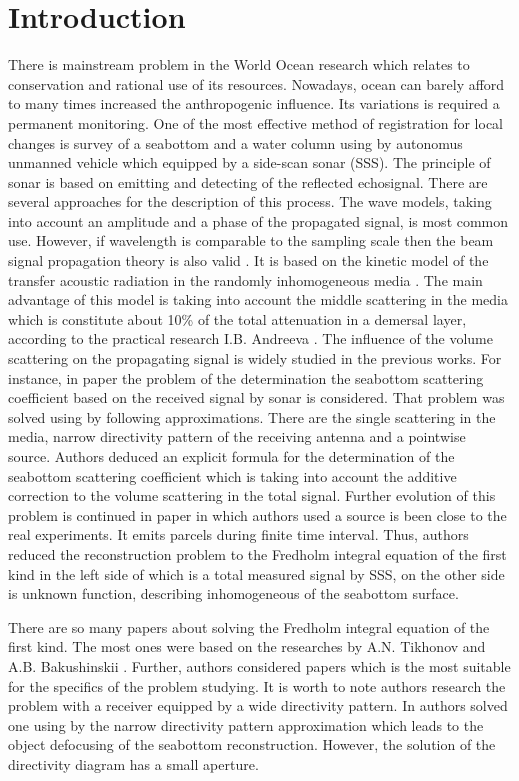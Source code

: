 \documentclass{procDDs}
\begin{document}
\section{Introduction}
There is mainstream problem in the World Ocean research which relates to conservation and rational use of its resources. Nowadays, ocean can barely afford to many times increased the anthropogenic influence. Its variations is required a permanent monitoring. One of the most effective method of registration for local changes is survey of a seabottom and a water column using by autonomus unmanned vehicle which equipped by a side-scan sonar (SSS). The principle of sonar is based on emitting and detecting of the reflected echosignal. There are several approaches for the description of this process. The wave models, taking into account an amplitude and a phase of the propagated signal, is most common use. However, if wavelength is comparable to the sampling scale then the beam signal propagation theory is also valid \cite{Turner, Zurk}. It is based on the kinetic model of the transfer acoustic radiation in the randomly inhomogeneous media \cite{AF2015, SPIE_KOV}. The main advantage of this model is taking into account the middle scattering in the media which is constitute about 10\% of the total attenuation in a demersal layer, according to the practical research I.B. Andreeva \cite{Andreeva}. The influence of the volume scattering on the propagating signal is widely studied in the previous works. For instance, in paper \cite{AF2015} the problem of the determination the seabottom scattering coefficient based on the received signal by sonar is considered. That problem was solved using by following approximations. There are the single scattering in the media, narrow directivity pattern of the receiving antenna and a pointwise source. Authors deduced an explicit formula for the determination of the seabottom scattering coefficient which is taking into account the additive correction to the volume scattering in the total signal. Further evolution of this problem is continued in paper \cite{SPIE_KOV} in which authors used a source is been close to the real experiments. It emits parcels during finite time interval. Thus, authors reduced the reconstruction problem to the Fredholm integral equation of the first kind in the left side of which is a total measured signal by SSS,  on the other side is unknown function, describing inhomogeneous of the seabottom surface.

There are so many papers about solving the Fredholm integral equation of the first kind. The most ones were based on the researches by A.N. Tikhonov and A.B. Bakushinskii \cite{Tikhonov, Baku}. Further, authors considered papers which is the most suitable for the specifics of the problem studying. It is worth to note authors research the problem with a receiver equipped by  a wide directivity pattern. In \cite{PRUAC} authors solved one using by the narrow directivity pattern approximation which leads to the object defocusing of the seabottom reconstruction. However, the solution of the directivity diagram has a small aperture.
\end{document}
